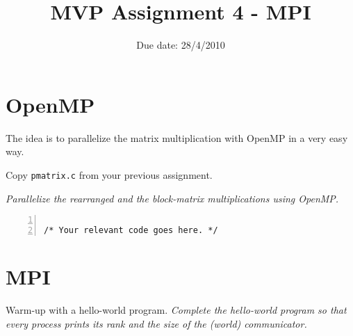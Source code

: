 \documentclass{article}
\title{MVP Assignment 4 - MPI}
\date{Due date: 28/4/2010}
\begin{document}
\maketitle

 \newcommand{\question}[1]{#1}
 \newcommand{\answer}[1]{}


%
%
\answer{
\begin{flushleft}
{\bf Group room:} FIXME\\
{\bf Group number:} FIXME
\end{flushleft}
}

\section{OpenMP}

The idea is to parallelize the matrix
multiplication with OpenMP in a very easy way.

\begin{ExerciseList}
\Exercise Copy \texttt{pmatrix.c} from your previous assignment.

\Question \emph{Parallelize the rearranged and the block-matrix
  multiplications using OpenMP.}

\end{ExerciseList}

\begin{lstlisting}[basicstyle=\small\sffamily,
keywords={break,case,const,continue,default,else,enum,
for,if,return,switch,while,do,long,void,int,float,double,
char,struct,typedef,include,size\_t},
keywordstyle={\color{blue}},
comment={[l]{//}}, morecomment={[s]{/*}{*/}}, commentstyle=\itshape,
columns={[l]flexible}, numbers=left, numberstyle=\tiny,
frameround=fftt, frame=shadowbox, captionpos=b,
caption={Your OpenMP implementation.},
label=LST:openmp]

/* Your relevant code goes here. */
\end{lstlisting}

\section{MPI}

\begin{ExerciseList}
\Exercise Warm-up with a hello-world program.
\Question \emph{Complete the hello-world program so that every process
  prints its rank and the size of the (world) communicator.}
\end{ExerciseList}
\end{document}
